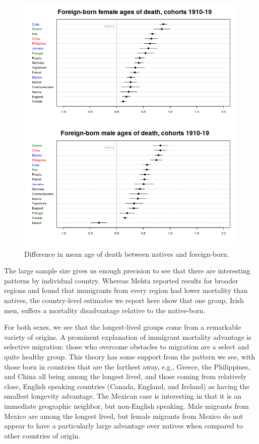 \documentclass[
  11pt,
]{article}
\begin{document}
\begin{figure}[H]
  \centering
  \includegraphics[width=6in]{../illustrations/immigrant_advantage_plot.png}
  \caption{Difference in mean age of death between natives and foreign-born.}
  \label{fig:immigrant_advantage}
\end{figure}

The large sample size gives us enough precision to see that there are
interesting patterns by individual country. Whereas Mehta reported
results for broader regions and found that immigrants from every region
had lower mortality than natives, the country-level estimates we report
here show that one group, Irish men, suffers a mortality disadvantage
relative to the native-born.

For both sexes, we see that the longest-lived groups come from a
remarkable variety of origins. A prominent explanation of immigrant
mortality advantage is selective migration: those who overcome obstacles
to migration are a select and quite healthy group. This theory has some
support from the pattern we see, with those born in countries that are
the farthest away, e.g., Greece, the Philippines, and China all being
among the longest lived, and those coming from relatively close, English
speaking countries (Canada, England, and Ireland) as having the smallest
longevity advantage. The Mexican case is interesting in that it is an
immediate geographic neighbor, but non-English speaking. Male migrants
from Mexico are among the longest lived, but female migrants from Mexico
do not appear to have a particularly large advantage over natives when
compared to other countries of origin.
\end{document}
